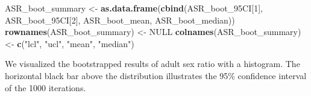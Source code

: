 \documentclass[]{article}
\newenvironment{Shaded}{\begin{snugshade}}{\end{snugshade}}
\newcommand{\KeywordTok}[1]{\textcolor[rgb]{0.13,0.29,0.53}{\textbf{{#1}}}}
\newcommand{\DecValTok}[1]{\textcolor[rgb]{0.00,0.00,0.81}{{#1}}}
\newcommand{\StringTok}[1]{\textcolor[rgb]{0.31,0.60,0.02}{{#1}}}
\newcommand{\OtherTok}[1]{\textcolor[rgb]{0.56,0.35,0.01}{{#1}}}
\newcommand{\NormalTok}[1]{{#1}}
\begin{document}
\begin{Shaded}
\begin{Highlighting}[]
\NormalTok{ASR_boot_summary <-}\StringTok{ }\KeywordTok{as.data.frame}\NormalTok{(}\KeywordTok{cbind}\NormalTok{(ASR_boot_95CI[}\DecValTok{1}\NormalTok{], ASR_boot_95CI[}\DecValTok{2}\NormalTok{], }
                                        \NormalTok{ASR_boot_mean, ASR_boot_median))}
\KeywordTok{rownames}\NormalTok{(ASR_boot_summary) <-}\StringTok{ }\OtherTok{NULL}
\KeywordTok{colnames}\NormalTok{(ASR_boot_summary) <-}\StringTok{ }\KeywordTok{c}\NormalTok{(}\StringTok{"lcl"}\NormalTok{, }\StringTok{"ucl"}\NormalTok{, }\StringTok{"mean"}\NormalTok{, }\StringTok{"median"}\NormalTok{)}
\end{Highlighting}
\end{Shaded}

We visualized the bootstrapped results of adult sex ratio with a
histogram. The horizontal black bar above the distribution illustrates
the 95\% confidence interval of the 1000 iterations.
\end{document}
